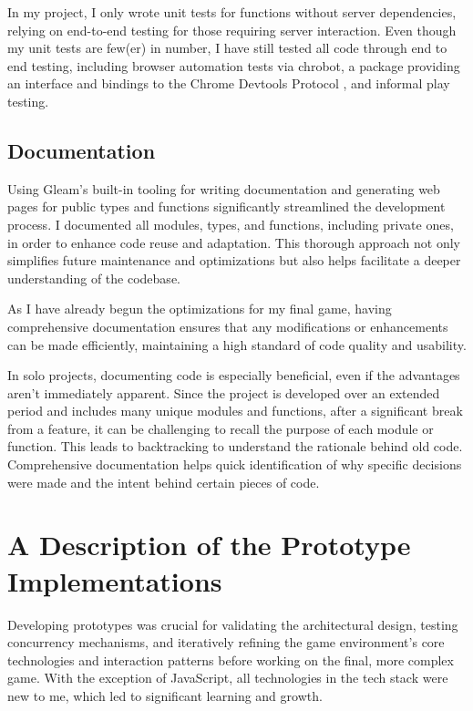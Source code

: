 \documentclass[]{final}
\begin{document}
In my project, I only wrote unit tests for functions without server
dependencies, relying on end-to-end testing for those requiring server interaction.
Even though my unit tests are few(er) in number, I have still tested all code through
end to end testing, including browser automation tests via chrobot, a package providing
an interface and bindings to the Chrome Devtools Protocol \cite{noauthor_chrobot_nodate},
and informal play testing.

\section{Documentation}
Using Gleam's built-in tooling for writing documentation and generating web pages
for public types and functions significantly streamlined the development process.
I documented all modules, types, and functions, including private ones,
in order to enhance code reuse and adaptation. This thorough approach not
only simplifies future maintenance and optimizations but also helps facilitate a
deeper understanding of the codebase.

As I have already begun the
optimizations for my final game, having comprehensive documentation
ensures that any modifications or enhancements can be made efficiently,
maintaining a high standard of code quality and usability.

In solo projects, documenting code is especially beneficial, even if the advantages
aren't immediately apparent. Since the project is developed over an extended period
and includes many unique modules and functions, after a significant break from a
feature, it can be challenging to recall the purpose of each module or function.
This leads to backtracking to understand the rationale behind old code.
Comprehensive documentation helps quick identification of why specific decisions
were made and the intent behind certain pieces of code.


\chapter{A Description of the Prototype Implementations}

Developing prototypes was crucial for validating the architectural design,
testing concurrency mechanisms, and iteratively refining the game environment's
core technologies and interaction patterns before working on the final,
more complex game. With the exception of JavaScript,
all technologies in the tech stack were new to me, which led to
significant learning and growth.
\end{document}
